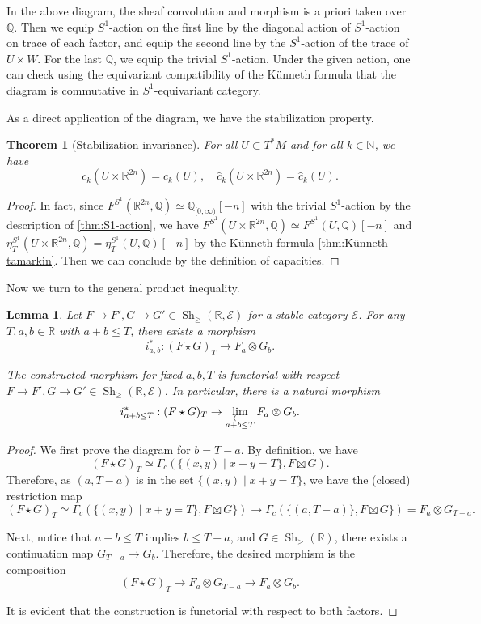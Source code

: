\documentclass[11pt]{amsart}
\numberwithin{equation}{section}
\theoremstyle{plain}
\newtheorem{Thm}{Theorem}[section]
\newtheorem{Lemma}[lemma]{Lemma}
\theoremstyle{definition}
\theoremstyle{remark}
\newcommand{\bQ} { {\mathbb{Q}}}
\newcommand{\bR} { {\mathbb{R}}}
\newcommand{\bN} { {\mathbb{N}}}
\newcommand{\cE} { {\mathcal{E}}}
\newcommand{\Sh} { {\operatorname{Sh}}}
\begin{document}
In the above diagram, the sheaf convolution and morphism is a priori taken over $\bQ$. Then we equip $S^1$-action on the first line by the diagonal action of $S^1$-action on trace of each factor, and equip the second line by the $S^1$-action of the trace of $U\times W$. For the last $\bQ$, we equip the trivial $S^1$-action. Under the given action, one can check using the equivariant compatibility of the Künneth formula that the diagram is commutative in $S^1$-equivariant category.

As a direct application of the diagram, we have the stabilization property.

\begin{Thm}[Stabilization invariance]\label{prop: stabilization invariance}For all $U\subset T^*M$ and for all $k\in \bN$, we have
\[c_k(U\times \bR^{2n})=c_k(U),\quad \widehat{c}_k(U\times \bR^{2n})=\widehat{c}_k(U).\]
\end{Thm}
\begin{proof}In fact, since $F^{S^1}(\bR^{2n},\bQ)\simeq \bQ_{[0,\infty)}[-n]$ with the trivial $S^1$-action by the description of \autoref{thm:S1-action}, we have $F^{S^1}(U\times \bR^{2n},\bQ)\simeq F^{S^1}(U,\bQ)[-n]$ and ${\eta^{S^1}_T(U\times  \bR^{2n},\bQ)}={\eta^{S^1}_T(U,\bQ)}[-n]$ by the Künneth formula \autoref{thm:Künneth tamarkin}. Then we can conclude by the definition of capacities.    
\end{proof}

Now we turn to the general product inequality.

\begin{Lemma}\label{lemma: very simple restriction of stalk of convolution}Let $F \to F',G\to G'\in \Sh_{\geq } (\bR,\mathcal{E})$ for a stable category $\cE$. For any $T,a,b\in \bR$ with $a+b\leq T$, there exists a morphism
\[i_{a,b}^*: (F\star G)_T \to  F_a\otimes G_b.\]

The constructed morphism for fixed $a,b,T$ is functorial with respect  $F\to F',G\to G'\in \Sh_{\geq } (\bR,\mathcal{E})$. In particular, there is a natural morphism
\[i_{a+b\leq T}^*: (F\star G)_T \to \varprojlim_{a+b\leq T} F_a\otimes G_b.\]
\end{Lemma}
\begin{proof}We first prove the diagram for $b=T-a$. By definition, we have
\[(F\star G)_T\simeq \Gamma_c(\{(x,y)\mid x+y=T\},F\boxtimes G).\]  
Therefore, as $(a,T-a)$ is in the set $\{(x,y)\mid x+y=T\}$, we have the (closed) restriction map
\[(F\star G)_T\simeq \Gamma_c(\{(x,y)\mid x+y=T\},F\boxtimes G\}) \to \Gamma_c(\{(a,T-a)\},F\boxtimes G\})=F_a\otimes G_{T-a}. \]

Next, notice that $a+b\leq T$ implies $b\leq T-a$, and $G\in \Sh_{\geq}(\bR)$, there exists a continuation map $G_{T-a}\to G_b$. Therefore, the desired morphism is the composition
\[(F\star G)_T\to F_a\otimes G_{T-a}  \to  F_a\otimes G_{b}.\]

It is evident that the construction is functorial with respect to both factors.
\end{proof}
\end{document}
